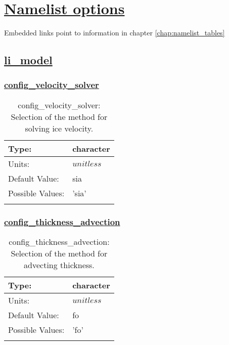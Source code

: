 \chapter[Namelist options]{\hyperref[chap:namelist_tables]{Namelist options}}
\label{chap:namelist_sections}
Embedded links point to information in chapter \ref{chap:namelist_tables}
\section[li\_model]{\hyperref[sec:nm_tab_li_model]{li\_model}}
\label{sec:nm_sec_li_model}
\subsection[config\_velocity\_solver]{\hyperref[sec:nm_tab_li_model]{config\_velocity\_solver}}
\label{subsec:nm_sec_config_velocity_solver}
\begin{center}
\begin{longtable}{| p{2.0in} | p{4.0in} |}
    \hline
    Type: & character \\
    \hline
    Units: & $unitless$ \\
    \hline
    Default Value: & sia \\
    \hline
    Possible Values: & 'sia' \\
    \hline
    \caption{config\_velocity\_solver: Selection of the method for solving ice velocity.}
\end{longtable}
\end{center}
\subsection[config\_thickness\_advection]{\hyperref[sec:nm_tab_li_model]{config\_thickness\_advection}}
\label{subsec:nm_sec_config_thickness_advection}
\begin{center}
\begin{longtable}{| p{2.0in} | p{4.0in} |}
    \hline
    Type: & character \\
    \hline
    Units: & $unitless$ \\
    \hline
    Default Value: & fo \\
    \hline
    Possible Values: & 'fo' \\
    \hline
    \caption{config\_thickness\_advection: Selection of the method for advecting thickness.}
\end{longtable}
\end{center}
